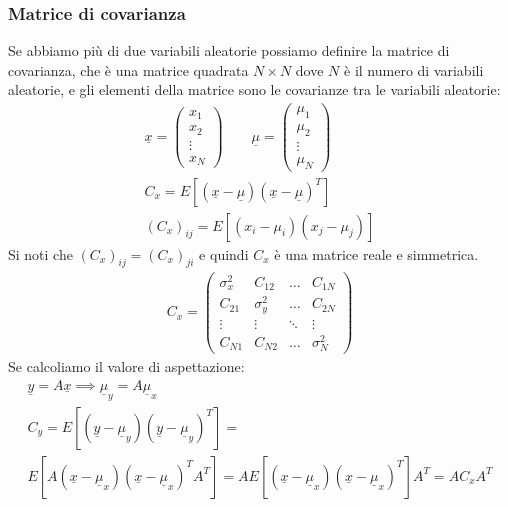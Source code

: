 \documentclass[a4paper, oneside]{article}
\begin{document}
\subsubsection{Matrice di covarianza}
Se abbiamo più di due variabili aleatorie possiamo definire la matrice di covarianza, che è una matrice quadrata $N \times N$ dove $N$ è il numero di variabili aleatorie, e gli elementi della matrice sono le covarianze tra le variabili aleatorie:
\begin{gather*}
    \underline{x} = \begin{pmatrix}
        x_1\\
        x_2\\
        \vdots\\
        x_N
    \end{pmatrix} \qquad \underline{\mu} = \begin{pmatrix}
        \mu_1\\
        \mu_2\\
        \vdots\\
        \mu_N
    \end{pmatrix} \\
    C_x = E[(\underline{x} - \underline{\mu})(\underline{x} - \underline{\mu})^T] \\
    (C_x)_{ij} = E[(x_i - \mu_i)(x_j - \mu_j)] 
\end{gather*}
Si noti che $(C_x)_{ij} = (C_x)_{ji}$ e quindi $C_x$ è una matrice reale e simmetrica.\\
\begin{gather*}
    C_x = \begin{pmatrix}
        \sigma_x^2 & C_{12} & \dots & C_{1N}\\
        C_{21} & \sigma_y^2 & \dots & C_{2N}\\
        \vdots & \vdots & \ddots & \vdots\\
        C_{N1} & C_{N2} & \dots & \sigma_N^2
    \end{pmatrix}
\end{gather*}
Se calcoliamo il valore di aspettazione:
\begin{gather*}
    \underline{y} = A \underline{x} \implies \underline{\mu}_y = A \underline{\mu}_x\\
    C_y = E[(\underline{y} - \underline{\mu}_y)(\underline{y} - \underline{\mu}_y)^T] =\\
    E[A(\underline{x} - \underline{\mu}_x)(\underline{x} - \underline{\mu}_x)^T A^T] = A E[(\underline{x} - \underline{\mu}_x)(\underline{x} - \underline{\mu}_x)^T] A^T = A C_x A^T
\end{gather*}
\end{document}
